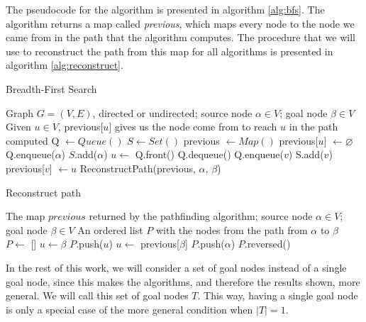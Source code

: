 \documentclass[a4paper,10pt]{report}
\begin{document}
The pseudocode for the algorithm is presented in algorithm \ref{alg:bfs}. The algorithm returns a map called \emph{previous}, which maps every node to the node we came from in the path that the algorithm computes. The procedure that we will use to reconstruct the path from this map for all algorithms is presented in algorithm \ref{alg:reconstruct}.

\begin{algorithm}
\caption{Breadth-First Search}
\label{alg:bfs}
\begin{algorithmic}[1]
\Require Graph $G = (V, E)$, directed or undirected; source node $\alpha \in V$; goal node $\beta \in V$
\Ensure Given $u \in V$, previous[$u$] gives us the node come from to reach $u$ in the path computed
\State Q $\gets Queue()$
\State $S \gets Set()$ 
\State previous $\gets Map()$
	\State previous[$u$] $\gets \varnothing$
\EndFor
\State Q.enqueue($\alpha$)
\State $S$.add($\alpha$)
	\State $u \gets$ Q.front()
	\State Q.dequeue()
			\State Q.enqueue($v$)
			\State S.add($v$)
			\State previous[$v$] $\gets u$
		\EndIf
	\EndFor
\EndWhile
\State \Return ReconstructPath(previous, $\alpha$, $\beta$)
\EndProcedure
\end{algorithmic}
\end{algorithm}

\begin{algorithm}
\caption{Reconstruct path}
\label{alg:reconstruct}
\begin{algorithmic}[1]
\Require The map $previous$ returned by the pathfinding algorithm; source node $\alpha \in V$; goal node $\beta \in V$
\Ensure An ordered list $P$ with the nodes from the path from $\alpha$ to $\beta$
\State $P \gets$ []  
\State $u \gets \beta$
	\State $P$.push($u$)
	\State $u \gets$ previous[$\beta$]
\EndWhile
\State $P$.push($\alpha$)
\State \Return $P$.reversed()
\EndProcedure
\end{algorithmic}
\end{algorithm}

In the rest of this work, we will consider a set of goal nodes instead of a single goal node, since this makes the algorithms, and therefore the results shown, more general. We will call this set of goal nodes $T$. This way, having a single goal node is only a special case of the more general condition when $|T| = 1$.
\end{document}
